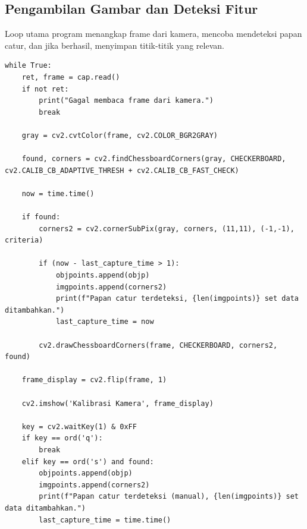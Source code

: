 \documentclass[12pt,a4paper]{article}
\begin{document}
\subsection{Pengambilan Gambar dan Deteksi Fitur}
Loop utama program menangkap frame dari kamera, mencoba mendeteksi papan catur,
dan jika berhasil, menyimpan titik-titik yang relevan.

\begin{lstlisting}[caption=Loop Utama: Pengambilan Gambar dan Deteksi Papan Catur, label=lst:loop]
while True:
    ret, frame = cap.read()
    if not ret:
        print("Gagal membaca frame dari kamera.")
        break

    gray = cv2.cvtColor(frame, cv2.COLOR_BGR2GRAY)

    found, corners = cv2.findChessboardCorners(gray, CHECKERBOARD, cv2.CALIB_CB_ADAPTIVE_THRESH + cv2.CALIB_CB_FAST_CHECK)

    now = time.time()

    if found:  
        corners2 = cv2.cornerSubPix(gray, corners, (11,11), (-1,-1), criteria)
        
        if (now - last_capture_time > 1):
            objpoints.append(objp)
            imgpoints.append(corners2)
            print(f"Papan catur terdeteksi, {len(imgpoints)} set data ditambahkan.")
            last_capture_time = now

        cv2.drawChessboardCorners(frame, CHECKERBOARD, corners2, found)
    
    frame_display = cv2.flip(frame, 1)

    cv2.imshow('Kalibrasi Kamera', frame_display)
    
    key = cv2.waitKey(1) & 0xFF
    if key == ord('q'):
        break
    elif key == ord('s') and found:
        objpoints.append(objp)
        imgpoints.append(corners2)
        print(f"Papan catur terdeteksi (manual), {len(imgpoints)} set data ditambahkan.")
        last_capture_time = time.time()
\end{lstlisting}
\end{document}
